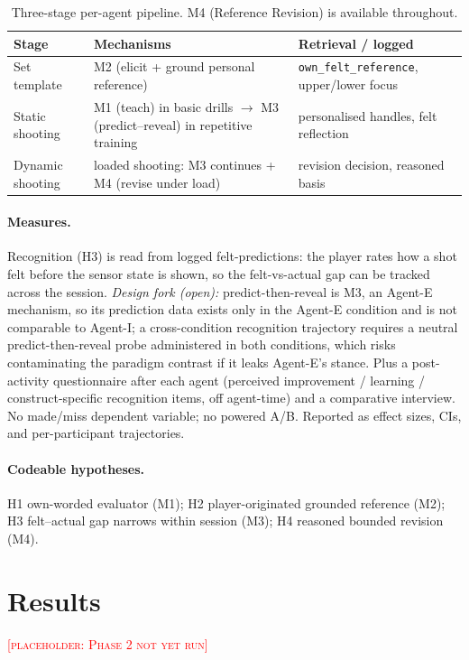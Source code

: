 \documentclass[sigconf]{acmart}
\newcommand{\vf}[1]{\textcolor{red}{[\textsc{#1}]}}
\begin{document}
\begin{table}[t]
\footnotesize
\caption{Three-stage per-agent pipeline. M4 (Reference Revision) is available throughout.}
\label{tab:pipeline}
\begin{tabular}{@{}p{1.7cm}p{3.1cm}p{2.2cm}@{}}
\toprule
Stage & Mechanisms & Retrieval / logged \\
\midrule
Set template & M2 (elicit + ground personal reference) & \texttt{own\_felt\_reference}, upper/lower focus \\
Static shooting & M1 (teach) in basic drills $\rightarrow$ M3 (predict--reveal) in repetitive training & personalised handles, felt reflection \\
Dynamic shooting & loaded shooting: M3 continues + M4 (revise under load) & revision decision, reasoned basis \\
\bottomrule
\end{tabular}
\end{table}

\paragraph{Measures.} Recognition (H3) is read from logged felt-predictions: the player rates how a shot felt before the sensor state is shown, so the felt-vs-actual gap can be tracked across the session. \emph{Design fork (open):} predict-then-reveal is M3, an Agent-E mechanism, so its prediction data exists only in the Agent-E condition and is not comparable to Agent-I; a cross-condition recognition trajectory requires a neutral predict-then-reveal probe administered in both conditions, which risks contaminating the paradigm contrast if it leaks Agent-E's stance. Plus a post-activity questionnaire after each agent (perceived improvement / learning / construct-specific recognition items, off agent-time) and a comparative interview. No made/miss dependent variable; no powered A/B. Reported as effect sizes, CIs, and per-participant trajectories.

\paragraph{Codeable hypotheses.} H1 own-worded evaluator (M1); H2 player-originated grounded reference (M2); H3 felt--actual gap narrows within session (M3); H4 reasoned bounded revision (M4).

\section{Results}
\vf{placeholder: Phase 2 not yet run}
\end{document}
